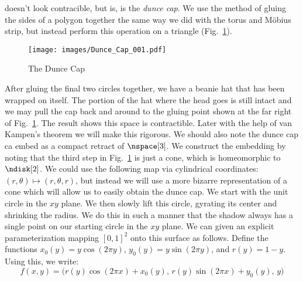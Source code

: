 \documentclass{book}                                                           %
\begin{document}
                doesn't look contracible, but is, is the \textit{dunce cap}. We
                use the method of gluing the sides of a polygon together the
                same way we did with the torus and M\"{o}bius strip, but instead
                perform this operation on a triangle
                (Fig.~\ref{fig:Dunce_Cap_001}).
                \begin{figure}
                    \centering
                    \captionsetup{type=figure}
                    \texttt{[image: images/Dunce\_Cap\_001.pdf]}
                    \caption{The Dunce Cap}
                    \label{fig:Dunce_Cap_001}
                \end{figure}
                After gluing the final two circles together, we have a beanie
                hat that has been wrapped on itself. The portion of the hat
                where the head goes is still intact and we may pull the cap back
                and around to the gluing point shown at the far right of
                Fig.~\ref{fig:Dunce_Cap_001}. The result shows this space is
                contractible. Later with the help of van Kampen's theorem we
                will make this rigorous. We should also note the dunce cap ca
                embed as a compact retract of $\nspace[3]$. We construct the
                embedding by noting that the third step in
                Fig.~\ref{fig:Dunce_Cap_001} is just a cone, which is
                homeomorphic to $\ndisk[2]$. We could use the following map via
                cylindrical coordinates: $(r,\theta)\mapsto(r,\theta,r)$,
                but instead we will use a more bizarre representation of a cone
                which will allow us to easily obtain the dunce cap. We start
                with the unit circle in the $xy$ plane. We then slowly lift this
                circle, gyrating its center and shrinking the radius. We do this
                in such a manner that the shadow always has a single point on
                our starting circle in the $xy$ plane. We can given an explicit
                parameterization mapping $[0,1]^{2}$ onto this surface as
                follows. Define the functions $x_{0}(y)=y\cos(2\pi{y})$,
                $y_{0}(y)=y\sin(2\pi{y})$, and $r(y)=1-y$. Using this, we write:
                \begin{equation}
                    \label{eqn:Func_for_Twisted_Cone}
                    f(x,y)=\big(
                        r(y)\cos(2\pi{x})+x_{0}(y),\,
                        r(y)\sin(2\pi{x})+y_{0}(y),\,
                        y
                    \big)
                \end{equation}
\end{document}

